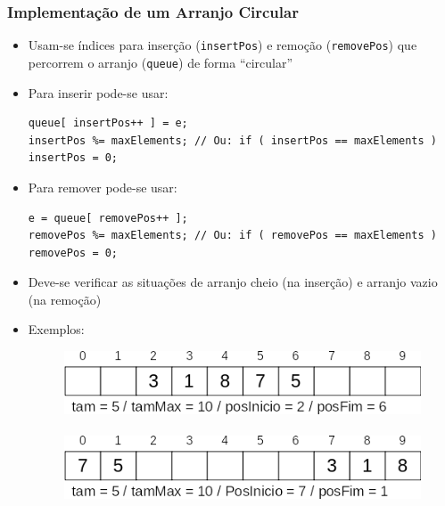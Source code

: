 \documentclass[aspectratio=169]{beamer}
\begin{document}
\begin{frame}[fragile]\frametitle{Implementação de um Arranjo Circular}
\begin{itemize}
	\item Usam-se índices para inserção (\texttt{insertPos}) e remoção (\texttt{removePos}) que percorrem o arranjo (\texttt{queue}) de forma ``circular''
	\item Para inserir pode-se usar:
\begin{lstlisting}[basicstyle=\ttfamily\scriptsize]
queue[ insertPos++ ] = e;
insertPos %= maxElements; // Ou: if ( insertPos == maxElements ) insertPos = 0;
\end{lstlisting}
	\item Para remover pode-se usar:
\begin{lstlisting}[basicstyle=\ttfamily\scriptsize]
e = queue[ removePos++ ];
removePos %= maxElements; // Ou: if ( removePos == maxElements ) removePos = 0;
\end{lstlisting}
	\item Deve-se verificar as situações de arranjo cheio (na inserção) e arranjo vazio (na remoção)
	\item Exemplos:
\begin{figure}[h]
	\flushleft
	\includegraphics[height=0.13\paperheight]{imagens/fila1a.png} ~ ~ ~ \includegraphics[height=0.13\paperheight]{imagens/fila1b.png}
\end{figure}
\end{itemize}
\end{frame}
\end{document}
